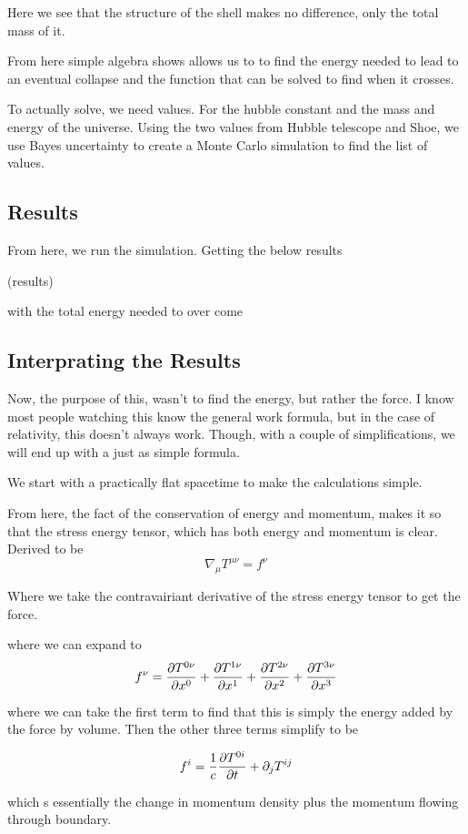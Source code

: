 Here we see that the structure of the shell makes no difference, only the total mass of it.

From here simple algebra shows allows us to to find the energy needed to lead to an eventual collapse and the function that can be solved to find when it crosses.

To actually solve, we need values. For the hubble constant and the mass and energy of the universe. Using the two values from Hubble telescope and Shoe, we use Bayes uncertainty to create a Monte Carlo simulation to find the list of values.

\subsection{Results}

From here, we run the simulation. Getting the below results

(results)

with the total energy needed to over come

\subsection{Interprating the Results}

Now, the purpose of this, wasn't to find the energy, but rather the force. I know most people watching this know the general work formula, but in the case of relativity, this doesn't always work. Though, with a couple of simplifications, we will end up with a just as simple formula.

We start with a practically flat spacetime to make the calculations simple.

From here, the fact of the conservation of energy and momentum, makes it so that the stress energy tensor, which has both energy and momentum is clear. Derived to be
\[
	\nabla_\mu T^{\mu \nu}= f^\nu
\]

Where we take the contravairiant derivative of the stress energy tensor to get the force.

where we can expand to
\[
	f^\nu = \pdv{T^{0\nu}}{x^0} + \pdv{T^{1\nu}}{x^1} + \pdv{T^{2\nu}}{x^2} + \pdv{T^{3\nu}}{x^3}
\]

where we can take the first term to find that this is simply the energy added by the force by volume. Then the other three terms simplify to be

\[
	f^i = \frac{1}{c}\pdv{T^{0i}}{t} + \partial_j T^{ij}
\]

which s essentially the change in momentum density plus the momentum flowing through boundary.

